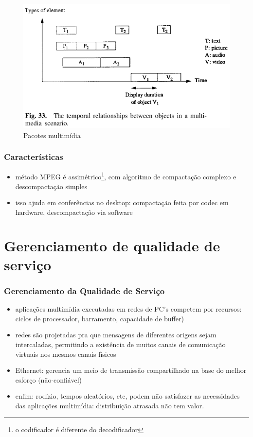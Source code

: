 \documentclass[]{beamer}
\begin{document}
\begin{frame}
  \begin{figure}[hbtp]
   \caption{Pacotes multimídia}
   \begin{center}
    \includegraphics[scale=0.31]{multimedia_packages.png}
   \end{center}
  \end{figure}
\end{frame}

\begin{frame}
  \frametitle{Características}
\begin{itemize}
  \item método MPEG é 
assimétrico\footnote{o codificador é diferente do decodificador}, com algoritmo de compactação complexo e descompactação
simples
  \item isso ajuda em conferências no desktop: compactação feita por codec em hardware, 
descompactação via software
\end{itemize}
\end{frame}

\section{Gerenciamento de qualidade de serviço}

\begin{frame}
  \frametitle{Gerenciamento da Qualidade de Serviço}
\begin{itemize}
  \item aplicações multimídia executadas em redes de PC's competem por recursos: ciclos 
de processador, barramento, capacidade de buffer)
  \item redes são projetadas pra que mensagens de diferentes origens sejam intercaladas,
permitindo a existência de muitos canais de comunicação virtuais nos mesmos canais físicos
  \item Ethernet: gerencia um meio de transmissão compartilhado na base do melhor esforço
(não-confiável)
  \item enfim: rodízio, tempos aleatórios, etc, podem não satisfazer as necessidades das
aplicações multimídia: distribuição atrasada não tem valor.
\end{itemize}
\end{frame}
\end{document}
